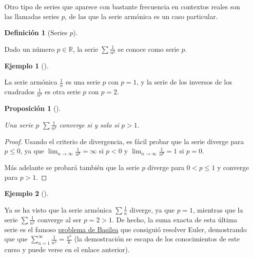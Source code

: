 \documentclass[
  a4paper,
]{scrreport}
\theoremstyle{definition}
\newtheorem{example}{Ejemplo}[chapter]
\theoremstyle{plain}
\theoremstyle{definition}
\newtheorem{definition}{Definición}[chapter]
\theoremstyle{definition}
\theoremstyle{plain}
\theoremstyle{plain}
\newtheorem{proposition}{Proposición}[chapter]
\theoremstyle{remark}
\begin{document}
Otro tipo de series que aparece con bastante frecuencia en contextos
reales son las llamadas series \(p\), de las que la serie armónica es un
caso particular.

\begin{definition}[Series
\(p\)]\protect\hypertarget{def-serie-p}{}\label{def-serie-p}

Dado un número \(p\in\mathbb{R}\), la serie \(\sum \frac{1}{n^p}\) se
conoce como serie \(p\).

\end{definition}

\begin{example}[]\protect\hypertarget{exm-series-p}{}\label{exm-series-p}

La serie armónica \(\frac{1}{n}\) es una serie \(p\) con \(p=1\), y la
serie de los inversos de los cuadrados \(\frac{1}{n^2}\) es otra serie
\(p\) con \(p=2\).

\end{example}

\begin{proposition}[]\protect\hypertarget{prp-convergencia-series-p}{}\label{prp-convergencia-series-p}

Una serie \(p\) \(\sum \frac{1}{n^p}\) converge si y solo si \(p>1\).

\end{proposition}

\begin{tcolorbox}[enhanced jigsaw, leftrule=.75mm, colbacktitle=quarto-callout-note-color!10!white, toprule=.15mm, opacityback=0, opacitybacktitle=0.6, toptitle=1mm, breakable, bottomtitle=1mm, colframe=quarto-callout-note-color-frame, rightrule=.15mm, titlerule=0mm, title=\textcolor{quarto-callout-note-color}{\faInfo}\hspace{0.5em}{Demostración}, arc=.35mm, left=2mm, bottomrule=.15mm, colback=white, coltitle=black]

\begin{proof}
Usando el criterio de divergencia, es fácil probar que la serie diverge
para \(p\leq 0\), ya que \(\lim_{n\to\infty} \frac{1}{n^p}=\infty\) si
\(p<0\) y \(\lim_{n\to\infty} \frac{1}{n^p}=1\) si \(p=0\).

Más adelante se probará también que la serie \(p\) diverge para
\(0<p\leq 1\) y converge para \(p>1\).
\end{proof}

\end{tcolorbox}

\begin{example}[]\protect\hypertarget{exm-convergencia-series-p}{}\label{exm-convergencia-series-p}

Ya se ha visto que la serie armónica \(\sum \frac{1}{n}\) diverge, ya
que \(p=1\), mientras que la serie \(\sum \frac{1}{n^2}\) converge al
ser \(p=2>1\). De hecho, la suma exacta de esta última serie es el
famoso \href{https://es.wikipedia.org/wiki/Problema_de_Basilea}{problema
de Basilea} que consiguió resolver Euler, demostrando que que
\(\sum_{n=1}^\infty \frac{1}{n^2} = \frac{\pi^2}{6}\) (la demostración
se escapa de los conocimientos de este curso y puede verse en el enlace
anterior).

\end{example}
\end{document}
